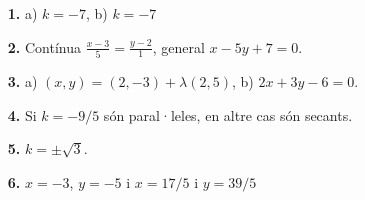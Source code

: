 \documentclass[a4paper, pdf, twoside]{book}
\begin{document}
\begin{multicols}{2}
\begin{enumerate}
 \end{enumerate}
\begin{enumerate}
\vspace{0.25cm}
\item[\fontfamily{phv}\selectfont\color{blue}\textbf{1. }]  \scalebox{0.6}{\simbolclau } 
 a) $k=-7$, b) $k=-7$
\vspace{0.25cm}
\item[\fontfamily{phv}\selectfont\color{blue}\textbf{2. }]  \scalebox{0.6}{\simbolclau } 
Contínua $\frac {x-3}{5}=\frac {y-2}{1}$, general $x-5y+7=0$.
\vspace{0.25cm}
\item[\fontfamily{phv}\selectfont\color{blue}\textbf{3. }]  \scalebox{0.6}{\simbolclau } 
a) $(x,y)=(2,-3)+\lambda (2, 5)$, b) $2x+3y-6=0$.
\vspace{0.25cm}
\item[\fontfamily{phv}\selectfont\color{blue}\textbf{4. }]  \scalebox{0.6}{\simbolclau } 
Si $k=-9/5$ són paral·leles, en altre cas són secants.
\vspace{0.25cm}
\item[\fontfamily{phv}\selectfont\color{blue}\textbf{5. }]  \scalebox{0.6}{\simbolclau } 
$k=\pm \sqrt {3}$.
\vspace{0.25cm}
\item[\fontfamily{phv}\selectfont\color{blue}\textbf{6. }]  \scalebox{0.6}{\simbolclau } 
$x=-3$, $y=-5$ i $x=17/5$ i $y=39/5$
 \end{enumerate}
\vfill\null
\columnbreak
\def\currentname{Solucions del Tema 10}
\vspace*{0.75cm}

 

\vspace*{0.4cm}
 {}
\vspace{0.3cm}



\end{multicols}
\end{document}
